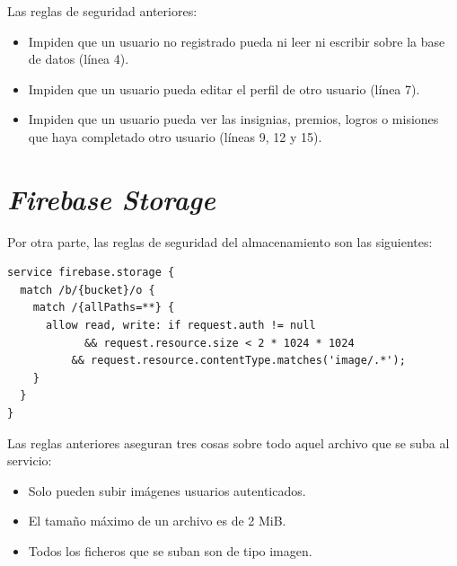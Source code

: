 \documentclass[twoside]{report}
\begin{document}
Las reglas de seguridad anteriores:
\begin{itemize}
\item Impiden que un usuario no registrado pueda ni leer ni escribir sobre la base de datos (línea 4).
\item Impiden que un usuario pueda editar el perfil de otro usuario (línea 7).
\item Impiden que un usuario pueda ver las insignias, premios, logros o misiones que haya completado otro usuario (líneas 9, 12 y 15).
\end{itemize}

\clearpage

\section*{\textit{Firebase Storage}}

Por otra parte, las reglas de seguridad del almacenamiento son las siguientes:

\begin{lstlisting}
service firebase.storage {
  match /b/{bucket}/o {
    match /{allPaths=**} {
      allow read, write: if request.auth != null 
      		&& request.resource.size < 2 * 1024 * 1024
          && request.resource.contentType.matches('image/.*');
    }
  }
}
\end{lstlisting}

Las reglas anteriores aseguran tres cosas sobre todo aquel archivo que se suba al servicio:
\begin{itemize}
\item Solo pueden subir imágenes usuarios autenticados.
\item El tamaño máximo de un archivo es de 2 MiB.
\item Todos los ficheros que se suban son de tipo imagen.
\end{itemize}
\end{document}
